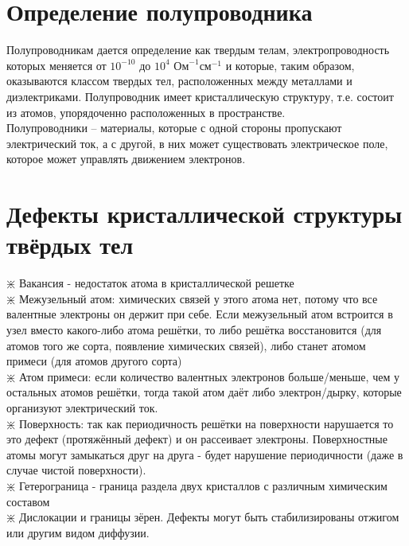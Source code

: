 \newcommand{\colontitulAutors}{astronom\_v\_cube}
\newcommand{\colontitulYear}{2022}
\newcommand{\colontitulEducationalSubject}{Основы теории полупроводников}
\newcommand{\colontitulTeacher}{Оболенский С.В.}




	\small
	\begin{multicols*}{2}
		\section{Определение полупроводника}
		Полупроводникам дается определение как твердым телам, электропроводность которых меняется от $10^{-10}$ до $10^4$ $\text{Ом}^{-1} \text{см}^{-1}$ и которые, таким образом, оказываются классом твердых тел, расположенных между металлами и диэлектриками. Полупроводник имеет кристаллическую
		структуру, т.е. состоит из атомов, упорядоченно расположенных в пространстве.\\
		Полупроводники – материалы, которые с одной стороны пропускают электрический ток, а с другой, в них может существовать электрическое поле, которое может управлять движением электронов.

		\section{Дефекты кристаллической структуры твёрдых тел}
		$\divideontimes$ Вакансия - недостаток атома в кристаллической решетке\\
		$\divideontimes$ Межузельный атом: химических связей у этого атома нет, потому что все валентные электроны он держит при себе. Если межузельный атом встроится в узел вместо какого-либо атома решётки, то либо решётка восстановится (для атомов того же сорта, появление химических связей), либо станет атомом примеси (для атомов другого сорта)\\
		$\divideontimes$ Атом примеси: если количество валентных электронов больше/меньше, чем у остальных атомов решётки, тогда такой атом даёт либо электрон/дырку, которые организуют электрический ток.\\
		$\divideontimes$ Поверхность: так как периодичность решётки на поверхности нарушается то это дефект (протяжённый дефект) и он рассеивает электроны. Поверхностные атомы могут замыкаться друг на друга - будет нарушение периодичности (даже в случае чистой поверхности).\\
		$\divideontimes$ Гетерограница - граница раздела двух кристаллов с различным химическим составом\\
		$\divideontimes$ Дислокации и границы зёрен. Дефекты могут быть стабилизированы отжигом или другим видом диффузии.


\end{multicols*}
